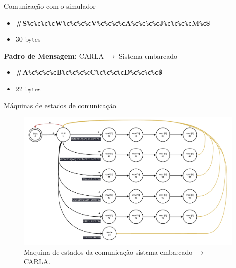 \documentclass{if-beamer}
\begin{document}
\begin{frame}{Comunicação com o simulador}
\begin{block}{}
		\begin{itemize}
			\item \textbf{\#S}\texttt{\%c\%c\%c\%c}\textbf{W}\texttt{\%c\%c\%c\%c}\textbf{V}\texttt{\%c\%c\%c\%c}\textbf{A}\texttt{\%c\%c\%c\%c}\textbf{J}\texttt{\%c\%c\%c\%c}\textbf{M}\texttt{\%c}\textbf{\$}
			\item 30 bytes
			
		\end{itemize}
		
		\textbf{Padro de Mensagem:} CARLA $\longrightarrow$ Sistema embarcado
		\begin{itemize}
			\item \textbf{\#A}\texttt{\%c\%c\%c\%c}\textbf{B}\texttt{\%c\%c\%c\%c}\textbf{C}\texttt{\%c\%c\%c\%c}\textbf{D}\texttt{\%c\%c\%c\%c}\textbf{\$}
			\item 22 bytes
			
		\end{itemize}
		
	\end{block}
	
\end{frame}

\begin{frame}{Máquinas de estados de comunicação}
	
	\begin{figure}[H]
		\centering
		\includegraphics[width=0.8\linewidth]{sm_uc_2_carla}
		\caption{Maquina de estados da comunicação sistema embarcado $\longrightarrow$ CARLA.}
		\label{fig:sm_uc_2_carla}
	\end{figure}
	
\end{frame}
\end{document}
